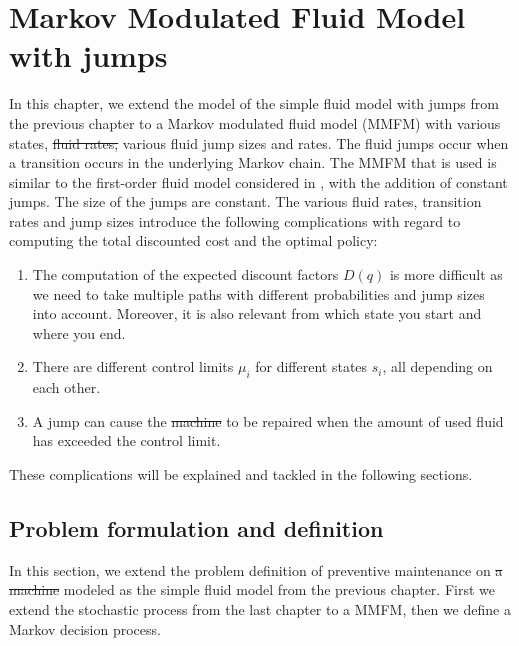 \documentclass[a4paper]{thesis}
\theoremstyle{definition}
\providecommand{\DIFaddtex}[1]{{\protect\color{blue}\uwave{#1}}} %
\providecommand{\DIFdeltex}[1]{{\protect\color{red}\sout{#1}}}                      %
\providecommand{\DIFaddbegin}{} %
\providecommand{\DIFaddend}{} %
\providecommand{\DIFdelbegin}{} %
\providecommand{\DIFdelend}{} %
\providecommand{\DIFadd}[1]{\texorpdfstring{\DIFaddtex{#1}}{#1}} %
\providecommand{\DIFdel}[1]{\texorpdfstring{\DIFdeltex{#1}}{}} %
\newcommand{\DIFscaledelfig}{0.5}
\newlength{\DIFdelgraphicswidth} %
\newlength{\DIFdelgraphicsheight} %
\newcommand{\DIFaddincludegraphics}[2][]{{\color{blue}\fbox{\DIFOincludegraphics[#1]{#2}}}} %
\newcommand{\DIFdelincludegraphics}[2][]{%
	\sbox{\DIFdelgraphicsbox}{\DIFOincludegraphics[#1]{#2}}%
	\settoboxwidth{\DIFdelgraphicswidth}{\DIFdelgraphicsbox} %
	\settoboxtotalheight{\DIFdelgraphicsheight}{\DIFdelgraphicsbox} %
	\scalebox{\DIFscaledelfig}{%
		\parbox[b]{\DIFdelgraphicswidth}{\usebox{\DIFdelgraphicsbox}\\[-\baselineskip] \rule{\DIFdelgraphicswidth}{0em}}\llap{\resizebox{\DIFdelgraphicswidth}{\DIFdelgraphicsheight}{%
				\setlength{\unitlength}{\DIFdelgraphicswidth}%
				\begin{picture}(1,1)%
				\thicklines\linethickness{2pt} %
				{\color[rgb]{1,0,0}\put(0,0){\framebox(1,1){}}}%
				{\color[rgb]{1,0,0}\put(0,0){\line( 1,1){1}}}%
				{\color[rgb]{1,0,0}\put(0,1){\line(1,-1){1}}}%
				\end{picture}%
			}\hspace*{3pt}}} %
} %
\DeclareRobustCommand{\DIFaddbegin}{\DIFOaddbegin \let\includegraphics\DIFaddincludegraphics} %
\DeclareRobustCommand{\DIFaddend}{\DIFOaddend \let\includegraphics\DIFOincludegraphics} %
\DeclareRobustCommand{\DIFdelbegin}{\DIFOdelbegin \let\includegraphics\DIFdelincludegraphics} %
\DeclareRobustCommand{\DIFdelend}{\DIFOaddend \let\includegraphics\DIFOincludegraphics} %
\begin{document}
	\chapter{Markov Modulated Fluid Model with jumps}\label{chapter:Mmfm}
	In this chapter, we extend the model of the simple fluid model with jumps from the previous chapter to a Markov modulated fluid model (MMFM) with various states, \DIFdelbegin \DIFdel{fluid rates, }\DIFdelend various fluid jump sizes and \DIFaddbegin \DIFadd{fluid }\DIFaddend rates.
	The fluid jumps occur when a transition occurs in the underlying Markov chain.
	The MMFM that is used is similar to the first-order fluid model considered in \cite{Gribaudo2007}, with the addition of constant jumps.
	The size of the jumps are constant.
	The various fluid rates, transition rates and jump sizes introduce the following complications with regard to computing the total discounted cost and the optimal policy:
	\begin{enumerate}
		\item The computation of the expected discount factors $D(q)$ is more difficult as we need to take multiple
		paths with different probabilities and jump sizes into account.
		Moreover, it is also relevant from which state you start and where you end.
		\item There are different control limits $\mu_i$ for different states $s_i$, all depending on each other.
		\item A jump can cause the \DIFdelbegin \DIFdel{machine }\DIFdelend \DIFaddbegin \DIFadd{asset }\DIFaddend to be repaired when the amount of used fluid has exceeded the control limit.
	\end{enumerate}
	These complications will be explained and tackled in the following sections.
	\section{Problem formulation and definition}
	In this section, we extend the problem definition of preventive maintenance on \DIFdelbegin \DIFdel{a machine }\DIFdelend \DIFaddbegin \DIFadd{an asset }\DIFaddend modeled as the simple fluid model from the previous chapter.
	First we extend the stochastic process from the last chapter to a MMFM, then we define a Markov decision process.
	
\end{document}

